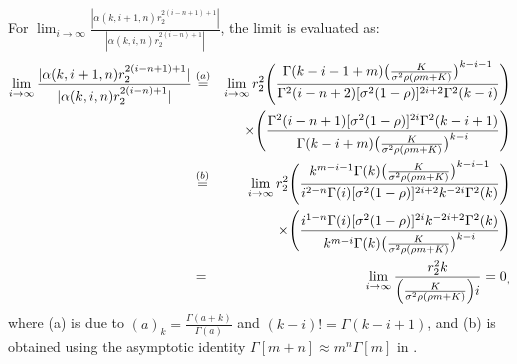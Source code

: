 For $\lim_{i \to \infty} \frac{|\alpha(k,i+1,n) r_2^{2(i-n+1)+1}|}{|\alpha(k,i,n) r_2^{2(i-n)+1}|}$, the limit is evaluated as:
\begin{eqnarray}
\lim_{i \to \infty} \frac{|\alpha(k,i+1,n) r_2^{2(i-n+1)+1}|}{|\alpha(k,i,n) r_2^{2(i-n)+1}|} & \stackrel{(a)}{=} & \lim_{i \to \infty} r_2^2 \Bigg( \frac{\Gamma(k-i-1+m) \big( \frac{K}{\sigma^2 \rho (\rho m + K)} \big)^{k-i-1}}{\Gamma^2(i-n+2)[\sigma^2 (1-\rho)]^{2i+2} \Gamma^2(k-i)} \Bigg) \nonumber \\
 & & \hspace{0.5cm} \times \Bigg( \frac{\Gamma^2(i-n+1)[\sigma^2 (1-\rho)]^{2i} \Gamma^2(k-i+1)}{\Gamma(k-i+m) \big( \frac{K}{\sigma^2 \rho (\rho m + K)} \big)^{k-i}} \Bigg) \nonumber \\
 & \stackrel{(b)}{=} & \lim_{i \to \infty} r_2^2 \Bigg( \frac{k^{m-i-1}\Gamma(k) \big( \frac{K}{\sigma^2 \rho (\rho m + K)} \big)^{k-i-1}}{i^{2-n}\Gamma(i)[\sigma^2 (1-\rho)]^{2i+2} k^{-2i} \Gamma^2(k)} \Bigg) \nonumber \\
 & & \hspace{0.5cm} \times \Bigg( \frac{i^{1-n}\Gamma(i)[\sigma^2 (1-\rho)]^{2i} k^{-2i+2} \Gamma^2(k)}{k^{m-i} \Gamma(k) \big( \frac{K}{\sigma^2 \rho (\rho m + K)} \big)^{k-i}} \Bigg) \nonumber \\
 & = & \lim_{i \to \infty} \frac{r_2^2 k}{\Big( \frac{K}{\sigma^2 \rho (\rho m + K)} \Big) i} = 0_, \label{NOMA_bivariate_Rician_Shadowed_pdf_corollary_convergence_proof_eq2}
\end{eqnarray}
where (a) is due to $(a)_k=\frac{\Gamma(a+k)}{\Gamma(a)}$ \cite[eq. (6.1.22)]{abramowitz1964handbook} and $(k-i)! = \Gamma(k-i+1)$, and (b) is obtained using the asymptotic identity $\Gamma[m+n] \approx m^n\Gamma[m]$ in \cite[eq. (25)]{rached2017unified}.

